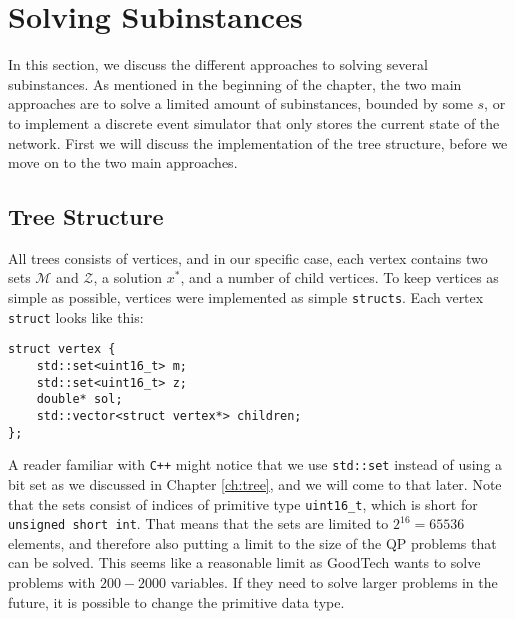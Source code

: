 \section{Solving Subinstances}
In this section, we discuss the different approaches to solving several
subinstances. As mentioned in the beginning of the chapter, the two
main approaches are to solve a limited amount of subinstances, bounded
by some $s$, or to implement a discrete event simulator that only stores
the current state of the network. First we will discuss the implementation
of the tree structure, before we move on to the two main approaches.

\subsection{Tree Structure}
All trees consists of vertices, and in our specific case, each vertex contains
two sets $\mathcal{M}$ and $\mathcal{Z}$, a solution $x^*$, and a number of
child vertices. To keep vertices as simple as possible, vertices were
implemented as simple \texttt{structs}. Each vertex \texttt{struct} looks like
this:
\begin{verbatim}
struct vertex {
    std::set<uint16_t> m;
    std::set<uint16_t> z;
    double* sol;
    std::vector<struct vertex*> children;
};
\end{verbatim}
A reader familiar with \texttt{C++} might notice that we use
\texttt{std::set} instead of using a bit set as we discussed
in Chapter \ref{ch:tree}, and we will come to that later. Note that
the sets consist of indices of primitive type \texttt{uint16\_t}, which is
short for \texttt{unsigned short int}. That means that the sets are limited to
$2^{16} = 65536$ elements, and therefore also putting a limit to the size
of the QP problems that can be solved. This seems like a reasonable limit
as GoodTech wants to solve problems with $200 - 2000$ variables.
If they need to solve larger problems in the future, it is possible to change
the primitive data type.

